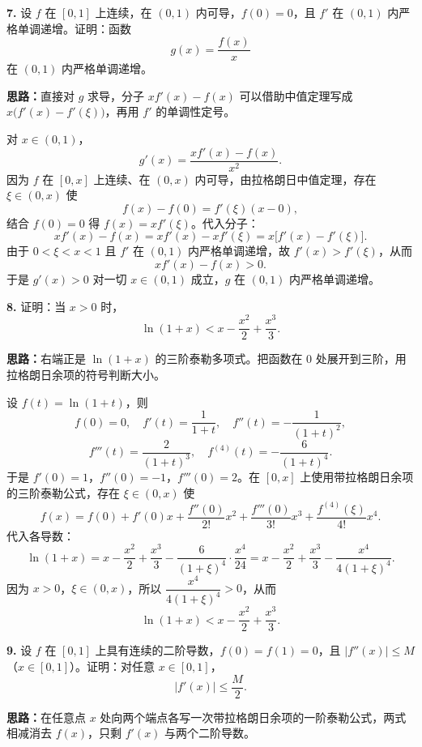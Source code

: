 \else \answerarea[10] \fi%

\textbf{7.} 设 $f$ 在 $[0,1]$ 上连续，在 $(0,1)$ 内可导，$f(0)=0$，且 $f'$ 在 $(0,1)$ 内严格单调递增。证明：函数
\[
g(x)=\frac{f(x)}{x}
\]
在 $(0,1)$ 内严格单调递增。

\ifshowsolutions%
\textbf{思路：}直接对 $g$ 求导，分子 $xf'(x)-f(x)$ 可以借助中值定理写成 $x\bigl(f'(x)-f'(\xi)\bigr)$，再用 $f'$ 的单调性定号。

对 $x\in(0,1)$，
\[
g'(x)=\frac{xf'(x)-f(x)}{x^{2}}.
\]
因为 $f$ 在 $[0,x]$ 上连续、在 $(0,x)$ 内可导，由拉格朗日中值定理，存在 $\xi\in(0,x)$ 使
\[
f(x)-f(0)=f'(\xi)(x-0),
\]
结合 $f(0)=0$ 得 $f(x)=xf'(\xi)$。代入分子：
\[
xf'(x)-f(x)=xf'(x)-xf'(\xi)=x\bigl[f'(x)-f'(\xi)\bigr].
\]
由于 $0<\xi<x<1$ 且 $f'$ 在 $(0,1)$ 内严格单调递增，故 $f'(x)>f'(\xi)$，从而
\[
xf'(x)-f(x)>0.
\]
于是 $g'(x)>0$ 对一切 $x\in(0,1)$ 成立，$g$ 在 $(0,1)$ 内严格单调递增。

\else \answerarea[10] \fi%

\textbf{8.} 证明：当 $x>0$ 时，
\[
\ln(1+x)<x-\frac{x^{2}}{2}+\frac{x^{3}}{3}.
\]

\ifshowsolutions%
\textbf{思路：}右端正是 $\ln(1+x)$ 的三阶泰勒多项式。把函数在 $0$ 处展开到三阶，用拉格朗日余项的符号判断大小。

设 $f(t)=\ln(1+t)$，则
\[
f(0)=0,\quad f'(t)=\frac{1}{1+t},\quad f''(t)=-\frac{1}{(1+t)^{2}},
\]
\[
f'''(t)=\frac{2}{(1+t)^{3}},\quad f^{(4)}(t)=-\frac{6}{(1+t)^{4}}.
\]
于是 $f'(0)=1$，$f''(0)=-1$，$f'''(0)=2$。在 $[0,x]$ 上使用带拉格朗日余项的三阶泰勒公式，存在 $\xi\in(0,x)$ 使
\[
f(x)=f(0)+f'(0)x+\frac{f''(0)}{2!}x^{2}+\frac{f'''(0)}{3!}x^{3}
+\frac{f^{(4)}(\xi)}{4!}x^{4}.
\]
代入各导数：
\[
\ln(1+x)=x-\frac{x^{2}}{2}+\frac{x^{3}}{3}
-\frac{6}{(1+\xi)^{4}}\cdot\frac{x^{4}}{24}
=x-\frac{x^{2}}{2}+\frac{x^{3}}{3}-\frac{x^{4}}{4(1+\xi)^{4}}.
\]
因为 $x>0$，$\xi\in(0,x)$，所以 $\dfrac{x^{4}}{4(1+\xi)^{4}}>0$，从而
\[
\ln(1+x)<x-\frac{x^{2}}{2}+\frac{x^{3}}{3}.
\]

\else \answerarea[10] \fi%

\textbf{9.} 设 $f$ 在 $[0,1]$ 上具有连续的二阶导数，$f(0)=f(1)=0$，且 $|f''(x)|\le M$（$x\in[0,1]$）。证明：对任意 $x\in[0,1]$，
\[
|f'(x)|\le\frac{M}{2}.
\]

\ifshowsolutions%
\textbf{思路：}在任意点 $x$ 处向两个端点各写一次带拉格朗日余项的一阶泰勒公式，两式相减消去 $f(x)$，只剩 $f'(x)$ 与两个二阶导数。

